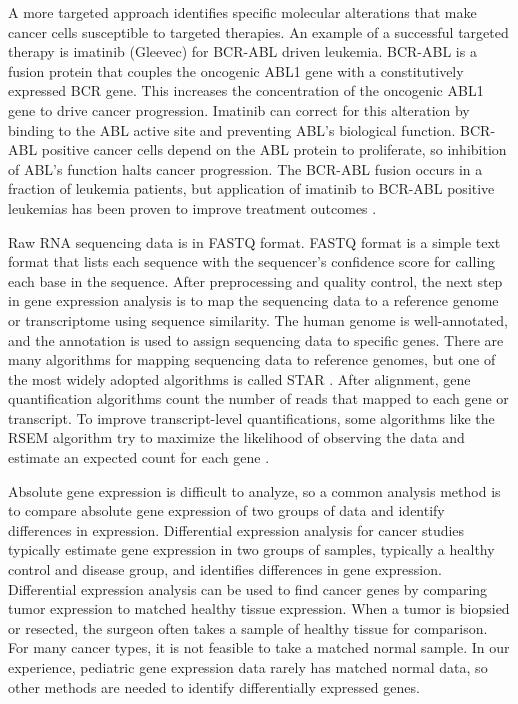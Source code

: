 \documentclass[fleqn,10pt]{wlscirep}
\begin{document}
A more targeted approach identifies specific molecular alterations that make cancer cells susceptible to targeted therapies. An example of a successful targeted therapy is imatinib (Gleevec) for BCR-ABL driven leukemia. BCR-ABL is a fusion protein that couples the oncogenic ABL1 gene with a constitutively expressed BCR gene. This increases the concentration of the oncogenic ABL1 gene to drive cancer progression. Imatinib can correct for this alteration by binding to the ABL active site and preventing ABL's biological function. BCR-ABL positive cancer cells depend on the ABL protein to proliferate, so inhibition of ABL's function halts cancer progression. The BCR-ABL fusion occurs in a fraction of leukemia patients, but application of imatinib to BCR-ABL positive leukemias has been proven to improve treatment outcomes \cite{wong2004bcr,bernt2014current}.

Raw RNA sequencing data is in FASTQ format. FASTQ format is a simple text format that lists each sequence with the sequencer's confidence score for calling each base in the sequence. After preprocessing and quality control, the next step in gene expression analysis is to map the sequencing data to a reference genome or transcriptome using sequence similarity. The human genome is well-annotated, and the annotation is used to assign sequencing data to specific genes. There are many algorithms for mapping sequencing data to reference genomes, but one of the most widely adopted algorithms is called STAR \cite{dobin2013star}. After alignment, gene quantification algorithms count the number of reads that mapped to each gene or transcript. To improve transcript-level quantifications, some algorithms like the RSEM algorithm try to maximize the likelihood of observing the data and estimate an expected count for each gene \cite{li2011rsem}.

Absolute gene expression is difficult to analyze, so a common analysis method is to compare absolute gene expression of two groups of data and identify differences in expression. Differential expression analysis for cancer studies typically estimate gene expression in two groups of samples, typically a healthy control and disease group, and identifies differences in gene expression. Differential expression analysis can be used to find cancer genes by comparing tumor expression to matched healthy tissue expression. When a tumor is biopsied or resected, the surgeon often takes a sample of healthy tissue for comparison. For many cancer types, it is not feasible to take a matched normal sample. In our experience, pediatric gene expression data rarely has matched normal data, so other methods are needed to identify differentially expressed genes.
\end{document}
